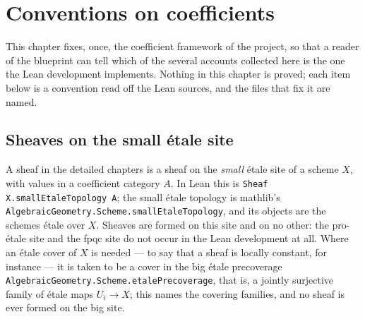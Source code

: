 
\chapter{Conventions on coefficients}\label{sec:conventions-coefficients}

This chapter fixes, once, the coefficient framework of the project, so that a
reader of the blueprint can tell which of the several accounts collected here
is the one the Lean development implements.  Nothing in this chapter is
proved; each item below is a convention read off the Lean sources, and the
files that fix it are named.

\section{Sheaves on the small \'etale site}

A sheaf in the detailed chapters is a sheaf on the \emph{small} \'etale site of
a scheme $X$, with values in a coefficient category $A$.  In Lean this is
\texttt{Sheaf X.smallEtaleTopology A}; the small \'etale topology is mathlib's
\texttt{AlgebraicGeometry.Scheme.smallEtaleTopology}, and its objects are the
schemes \'etale over $X$.  Sheaves are formed on this site and on no other:
the pro-\'etale site and the fpqc site do not occur in the Lean development at
all.  Where an \'etale cover of $X$ is needed --- to say that a sheaf is
locally constant, for instance --- it is taken to be a cover in the big
\'etale precoverage \texttt{AlgebraicGeometry.Scheme.etalePrecoverage}, that
is, a jointly surjective family of \'etale maps $U_i\to X$; this names the
covering families, and no sheaf is ever formed on the big site.

